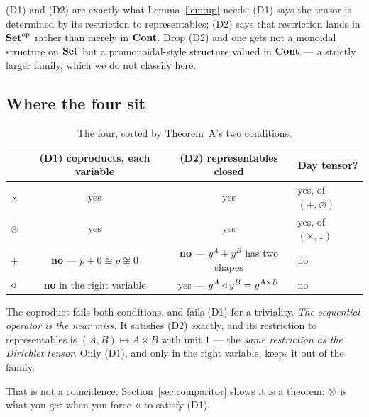 \begin{Remark}\label{rem:D1D2}
(D1) and (D2) are exactly what Lemma~\ref{lem:up} needs: (D1) says the tensor is
determined by its restriction to representables; (D2) says that restriction
lands in $\mathbf{Set}^{\mathrm{op}}$ rather than merely in $\mathbf{Cont}$. Drop (D2) and one
gets not a monoidal structure on $\mathbf{Set}$ but a promonoidal-style structure valued
in $\mathbf{Cont}$ --- a strictly larger family, which we do not classify here.
\end{Remark}

\subsection{Where the four sit}

\begin{table}[h]
\centering
\begin{tabular}{@{}lccl@{}}
\toprule
 & (D1) coproducts, each variable & (D2) representables closed & Day tensor? \\
\midrule
$\times$ & yes & yes & yes, of $(+,\varnothing)$ \\
$\mathbin{\otimes}$   & yes & yes & yes, of $(\times,1)$ \\
$+$      & \textbf{no} --- $p+0\cong p\not\cong 0$ &
           \textbf{no} --- $y^A+y^B$ has two shapes & no \\
$\mathbin{\triangleleft}$   & \textbf{no} in the right variable\footnotemark &
           yes --- $y^A\mathbin{\triangleleft} y^B=y^{A\times B}$ & no \\
\bottomrule
\end{tabular}
\caption{The four, sorted by Theorem~A's two conditions.}
\label{tab:sorting}
\end{table}

The coproduct fails both conditions, and fails (D1) for a triviality. \emph{The
sequential operator is the near miss.} It satisfies (D2) exactly, and its
restriction to representables is $(A,B)\mapsto A\times B$ with unit
$1$ --- the \emph{same restriction as the Dirichlet tensor}. Only (D1), and only
in the right variable, keeps it out of the family.

That is not a coincidence. Section~\ref{sec:comparitor} shows it is a theorem:
$\mathbin{\otimes}$ is what you get when you force $\mathbin{\triangleleft}$ to satisfy (D1).

